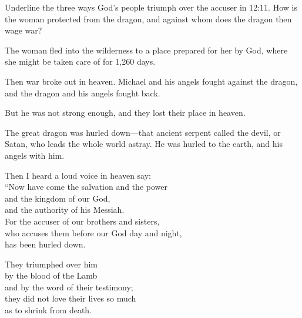 \begin{ScriptureBox2}{Underline the three ways God's people triumph over the accuser in 12:11. How is the woman protected from the dragon, and against whom does the dragon then wage war?}

\item[12:6] The woman fled into the wilderness to a place prepared for her by God, where she might be taken care of for 1,260 days.

\item[12:7] Then war broke out in heaven. Michael and his angels fought against the dragon, and the dragon and his angels fought back.

\item[12:8] But he was not strong enough, and they lost their place in heaven.

\item[12:9] The great dragon was hurled down---that ancient serpent called the devil, or Satan, who leads the whole world astray. He was hurled to the earth, and his angels with him.

\item[12:10] Then I heard a loud voice in heaven say:\\
\hspace*{1em}``Now have come the salvation and the power\\
\hspace*{2em}and the kingdom of our God,\\
\hspace*{2em}and the authority of his Messiah.\\
\hspace*{1em}For the accuser of our brothers and sisters,\\
\hspace*{2em}who accuses them before our God day and night,\\
\hspace*{2em}has been hurled down.

\item[12:11] \hspace*{1em}They triumphed over him\\
\hspace*{2em}by the blood of the Lamb\\
\hspace*{2em}and by the word of their testimony;\\
\hspace*{1em}they did not love their lives so much\\
\hspace*{2em}as to shrink from death.


\end{ScriptureBox2}
